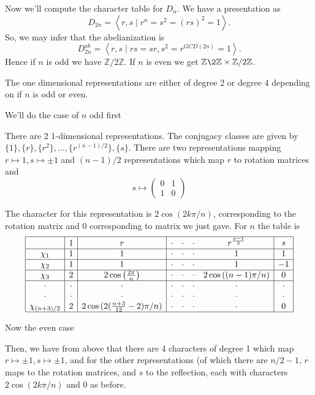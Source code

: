 \documentclass[11pt]{article}
\begin{document}
Now we'll compute the character table for $D_n$. We have a presentation as 
\[D_{2n} = \left< r,s \mid r^n = s^2 = (rs)^2 = 1 \right>.\] So, we may infer that the abelianization is 
\[D_{2n}^{ab} = \left< r,s \mid rs = sr , s^2 = r^{GCD(2n)} = 1 \right>.\]
Hence if  $n$ is odd we have $\mathbb{Z}/2\mathbb{Z}$. If $n$ is even we get $\mathbb{Z}\2\mathbb{Z} \times \mathbb{Z}/2\mathbb{Z}$. 

The one dimensional representations are either of degree 2 or degree 4 depending on if $n$ is odd or even.

We'll do the case of $n$ odd first

There are 2 1-dimensional representations. The conjugacy classes are given by $\{1\},\{r\},\{r^2\}, \dots, \{r^{(n-1)/2}\},\{s\}$. There are two representations mapping $r \mapsto 1, s \mapsto \pm 1 $ and $(n-1)/2$ representations which map $r$ to rotation matrices and
\[s \mapsto \left( \begin{array}{cc} 0&1 \\ 1& 0 \end{array} \right)\]

The character for this representation is $2 \cos{(2 k \pi /n)}$, corresponding to the rotation matrix and 0 corresponding to matrix we just gave. For $n$ the table is
\[\begin{array}{|c|c|c|cccc|c|}
\hline
&1&r&\cdot&\cdot&\cdot&r^{\frac{n-1}{2}}&s\\
\hline
\chi_1&1&1&\cdot&\cdot&\cdot&1&1\\
\hline
\chi_2&1&1&\cdot&\cdot&\cdot&1&-1\\
\hline
\chi_3&2&2 \cos{\left(\frac{2 \pi }{ n}\right)}&\cdot&\cdot&\cdot&2 \cos{((n-1) \pi / n)}&0\\
\hline
\cdot&\cdot&\cdot&\cdot&\cdot&\cdot&\cdot&\cdot\\
\cdot&\cdot&\cdot&\cdot&\cdot&\cdot&\cdot&\cdot\\
\chi_{(n+3)/2}&2&2\cos{(2(\frac{n+3}{12} -2)\pi/n)}&\cdot&\cdot&\cdot&\cdot&0\\
\hline
\end{array}\]

Now the even case

Then, we have from above that there are 4 characters of degree 1 which map $r \mapsto \pm 1, s \mapsto \pm 1$, and for the other representations (of which there are $n/2-1$, $r$ maps to the rotation matrices, and $s$ to the reflection, each with characters $2 \cos{(2 k \pi /n)}$ and 0 as before.
\end{document}
